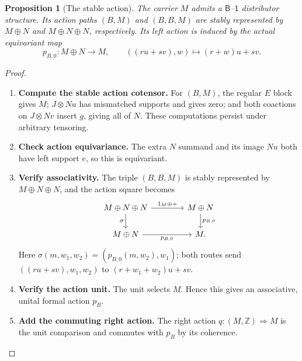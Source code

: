 \documentclass[11pt,reqno]{amsart}
\theoremstyle{plain}
\newtheorem{proposition}[theorem]{Proposition}
\theoremstyle{definition}
\theoremstyle{remark}
\numberwithin{equation}{section}
\newcommand{\cell}{\mathrel{\Longrightarrow}}
\newcommand{\Z}{\mathbb Z}
\newcommand{\Icat}{\mathsf 1}
\begin{document}
\begin{proposition}[The stable action]\label{strong:prop:stable-action}
The carrier $M$ admits a $\mathsf B$--$\Icat$ distributor structure.
Its action paths $(B,M)$ and $(B,B,M)$ are stably represented by
$M\oplus N$ and $M\oplus N\oplus N$, respectively. Its left action
is induced by the actual equivariant map
\[
p_{B,0}:M\oplus N\longrightarrow M,\qquad
((ru+sv),w)\longmapsto(r+w)u+sv.
\]
\end{proposition}
\begin{proof}\leavevmode
\begin{enumerate}
\item \textbf{Compute the stable action cotensor.} For $(B,M)$, the regular $E$ block gives $M$;
$J\otimes Nu$ has mismatched supports and gives zero; and both
coactions on $J\otimes Nv$ insert $g$, giving all of $N$.
These computations persist under arbitrary tensoring.

\item \textbf{Check action equivariance.} The extra $N$ summand and its image $Nu$ both have left support $e$,
so this is equivariant.

\item \textbf{Verify associativity.} The triple $(B,B,M)$ is stably represented by
$M\oplus N\oplus N$, and the action square becomes
\[
\begin{tikzcd}[column sep=4em]
M\oplus N\oplus N \arrow[r,"1_M\oplus+"] \arrow[d,"\sigma"'] &
M\oplus N \arrow[d,"p_{B,0}"]\\
M\oplus N \arrow[r,"p_{B,0}"'] & M.
\end{tikzcd}
\]
Here $\sigma(m,w_1,w_2)=(p_{B,0}(m,w_2),w_1)$; both routes send
$((ru+sv),w_1,w_2)$ to $(r+w_1+w_2)u+sv$.

\item \textbf{Verify the action unit.} The unit selects $M$.
Hence this gives an associative, unital formal action $p_B$.

\item \textbf{Add the commuting right action.} The right action $q:(M,\Z)\cell M$ is the unit comparison and commutes
with $p_B$ by its coherence.\qedhere
\end{enumerate}
\end{proof}
\end{document}
